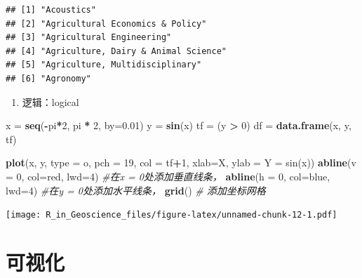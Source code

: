 \documentclass[]{scrbook}
\newenvironment{Shaded}{\begin{snugshade}}{\end{snugshade}}
\newcommand{\CommentTok}[1]{\textcolor[rgb]{0.56,0.35,0.01}{\textit{#1}}}
\newcommand{\DataTypeTok}[1]{\textcolor[rgb]{0.13,0.29,0.53}{#1}}
\newcommand{\DecValTok}[1]{\textcolor[rgb]{0.00,0.00,0.81}{#1}}
\newcommand{\FloatTok}[1]{\textcolor[rgb]{0.00,0.00,0.81}{#1}}
\newcommand{\KeywordTok}[1]{\textcolor[rgb]{0.13,0.29,0.53}{\textbf{#1}}}
\newcommand{\NormalTok}[1]{#1}
\newcommand{\OperatorTok}[1]{\textcolor[rgb]{0.81,0.36,0.00}{\textbf{#1}}}
\newcommand{\StringTok}[1]{\textcolor[rgb]{0.31,0.60,0.02}{#1}}
\providecommand{\tightlist}{%
  \setlength{\itemsep}{0pt}\setlength{\parskip}{0pt}}
\begin{document}
\begin{verbatim}
## [1] "Acoustics"                          
## [2] "Agricultural Economics & Policy"    
## [3] "Agricultural Engineering"           
## [4] "Agriculture, Dairy & Animal Science"
## [5] "Agriculture, Multidisciplinary"     
## [6] "Agronomy"
\end{verbatim}

\begin{enumerate}
\def\labelenumi{\arabic{enumi}.}
\tightlist
\item
  逻辑：logical
\end{enumerate}

\begin{Shaded}
\begin{Highlighting}[]
\NormalTok{x =}\StringTok{ }\KeywordTok{seq}\NormalTok{(}\OperatorTok{{-}}\NormalTok{pi}\OperatorTok{*}\DecValTok{2}\NormalTok{, pi }\OperatorTok{*}\StringTok{ }\DecValTok{2}\NormalTok{, }\DataTypeTok{by=}\FloatTok{0.01}\NormalTok{)}
\NormalTok{y =}\StringTok{ }\KeywordTok{sin}\NormalTok{(x)}
\NormalTok{tf =}\StringTok{ }\NormalTok{(y }\OperatorTok{\textgreater{}}\StringTok{ }\DecValTok{0}\NormalTok{)}
\NormalTok{df =}\StringTok{ }\KeywordTok{data.frame}\NormalTok{(x, y, tf)}

\KeywordTok{plot}\NormalTok{(x, y, }\DataTypeTok{type =} \StringTok{\textquotesingle{}o\textquotesingle{}}\NormalTok{, }\DataTypeTok{pch =} \DecValTok{19}\NormalTok{, }\DataTypeTok{col =}\NormalTok{ tf}\OperatorTok{+}\DecValTok{1}\NormalTok{, }\DataTypeTok{xlab=}\StringTok{\textquotesingle{}X\textquotesingle{}}\NormalTok{, }\DataTypeTok{ylab =} \StringTok{\textquotesingle{}Y = sin(x)\textquotesingle{}}\NormalTok{)}
\KeywordTok{abline}\NormalTok{(}\DataTypeTok{v =} \DecValTok{0}\NormalTok{, }\DataTypeTok{col=}\StringTok{\textquotesingle{}red\textquotesingle{}}\NormalTok{, }\DataTypeTok{lwd=}\DecValTok{4}\NormalTok{) }\CommentTok{\#在x = 0处添加垂直线条，}
\KeywordTok{abline}\NormalTok{(}\DataTypeTok{h =} \DecValTok{0}\NormalTok{, }\DataTypeTok{col=}\StringTok{\textquotesingle{}blue\textquotesingle{}}\NormalTok{, }\DataTypeTok{lwd=}\DecValTok{4}\NormalTok{) }\CommentTok{\#在y = 0处添加水平线条，}
\KeywordTok{grid}\NormalTok{()  }\CommentTok{\# 添加坐标网格}
\end{Highlighting}
\end{Shaded}

\texttt{[image: R\_in\_Geoscience\_files/figure-latex/unnamed-chunk-12-1.pdf]}

\hypertarget{ux53efux89c6ux5316}{%
\section{可视化}\label{ux53efux89c6ux5316}}
\end{document}
